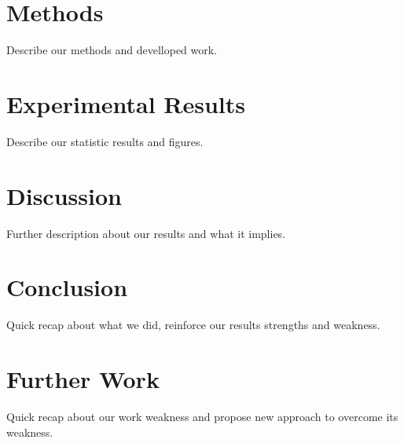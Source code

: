 \documentclass[conference]{IEEEtran}
\newcommand{\reviewUrgent}[1]{{\color{red} #1}} %
\begin{document}
\section{Methods}
\reviewUrgent{Describe our methods and develloped work.}


\section{Experimental Results}
\reviewUrgent{Describe our statistic results and figures.}


\section{Discussion}
\reviewUrgent{Further description about our results and what it implies.}


\section{Conclusion}
\reviewUrgent{Quick recap about what we did, reinforce our results strengths and weakness.}

\section{Further Work}
\reviewUrgent{Quick recap about our work weakness and propose new approach to overcome its weakness.}




\end{document}

